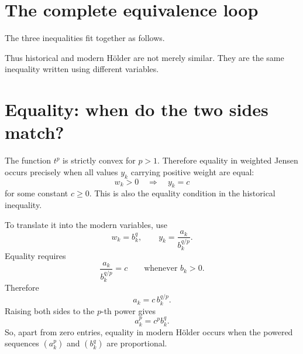 \documentclass[11pt]{article}
\begin{document}
\section{The complete equivalence loop}

The three inequalities fit together as follows.

\begin{center}
\end{center}

Thus historical and modern H\"older are not merely similar. They are the same inequality written using different variables.

\section{Equality: when do the two sides match?}

The function \(t^p\) is strictly convex for \(p>1\). Therefore equality in weighted Jensen occurs precisely when all values \(y_k\) carrying positive weight are equal:
\[
 w_k>0\quad\Longrightarrow\quad y_k=c
 \tag{36}
\]
for some constant \(c\geq0\). This is also the equality condition in the historical inequality.

To translate it into the modern variables, use
\[
 w_k=b_k^q,
 \qquad
 y_k=\frac{a_k}{b_k^{q/p}}.
\]
Equality requires
\[
 \frac{a_k}{b_k^{q/p}}=c
 \qquad\text{whenever }b_k>0.
 \tag{37}
\]
Therefore
\[
 a_k=c\,b_k^{q/p}.
\]
Raising both sides to the \(p\)-th power gives
\[
 \boxed{a_k^p=c^p b_k^q.}
 \tag{38}
\]
So, apart from zero entries, equality in modern H\"older occurs when the powered sequences \((a_k^p)\) and \((b_k^q)\) are proportional.
\end{document}
